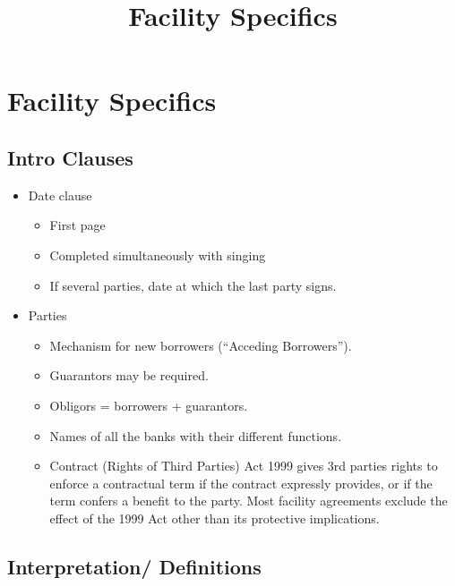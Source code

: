 \documentclass[
]{article}
\title{Facility Specifics}
\author{}
\date{}
\providecommand{\tightlist}{%
  \setlength{\itemsep}{0pt}\setlength{\parskip}{0pt}}
\begin{document}
\maketitle

{
\setcounter{tocdepth}{3}
\tableofcontents
}
\hypertarget{facility-specifics}{%
\section{Facility Specifics}\label{facility-specifics}}

\hypertarget{intro-clauses}{%
\subsection{Intro Clauses}\label{intro-clauses}}

\begin{itemize}
\tightlist
\item
  Date clause

  \begin{itemize}
  \tightlist
  \item
    First page
  \item
    Completed simultaneously with singing
  \item
    If several parties, date at which the last party signs.
  \end{itemize}
\item
  Parties

  \begin{itemize}
  \tightlist
  \item
    Mechanism for new borrowers (``Acceding Borrowers'').
  \item
    Guarantors may be required.
  \item
    Obligors = borrowers + guarantors.
  \item
    Names of all the banks with their different functions.
  \item
    Contract (Rights of Third Parties) Act 1999 gives 3rd parties rights
    to enforce a contractual term if the contract expressly provides, or
    if the term confers a benefit to the party. Most facility agreements
    exclude the effect of the 1999 Act other than its protective
    implications.
  \end{itemize}
\end{itemize}

\hypertarget{interpretation-definitions}{%
\subsection{Interpretation/
Definitions}\label{interpretation-definitions}}
\end{document}
